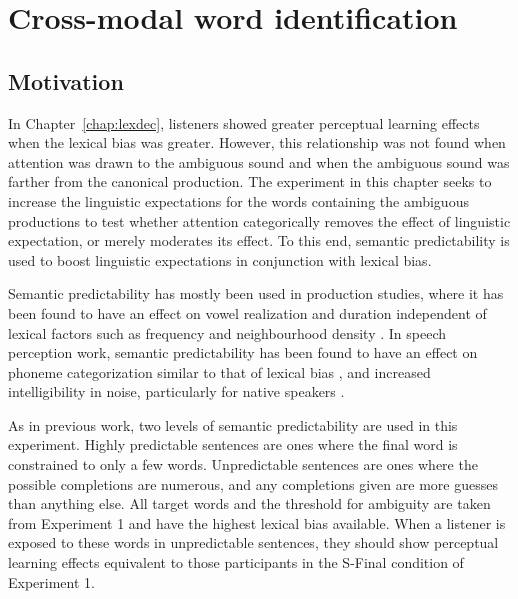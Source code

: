 
\chapter{Cross-modal word identification}
\label{chap:sent}


\section{Motivation}

In Chapter~\ref{chap:lexdec}, listeners showed greater perceptual learning effects when the lexical bias was greater.  
However, this relationship was not found when attention was drawn to the ambiguous sound and when the ambiguous sound was farther from the canonical production.  
The experiment in this chapter seeks to increase the linguistic expectations for the words containing the ambiguous productions to test whether attention categorically removes the effect of linguistic expectation, or merely moderates its effect.  
To this end, semantic predictability is used to boost linguistic expectations in conjunction with lexical bias.

Semantic predictability has mostly been used in production studies, where it has been found to have an effect on vowel realization and duration independent of lexical factors such as frequency and neighbourhood density \citep{Scarborough2010, Clopper2008}.  
In speech perception work, semantic predictability has been found to have an effect on phoneme categorization similar to that of lexical bias \citep{Borsky1998}, and increased intelligibility in noise, particularly for native speakers \citep[and others]{Kalikow1977, Mayo1997, Fallon2002, Bradlow2007}.

As in previous work, two levels of semantic predictability are used in this experiment.  
Highly predictable sentences are ones where the final word is constrained to only a few words.  
Unpredictable sentences are ones where the possible completions are numerous, and any completions given are more guesses than anything else.
All target words and the threshold for ambiguity are taken from Experiment 1 and have the highest lexical bias available.
When a listener is exposed to these words in unpredictable sentences, they should show perceptual learning effects equivalent to those participants in the S-Final condition of Experiment 1.

